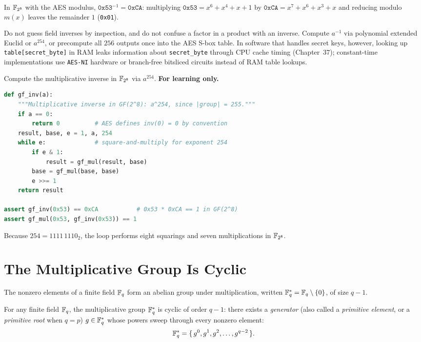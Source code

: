 \begin{example}[An inverse]
\label{ch06:ex-inverse}
In $\mathbb{F}_{2^8}$ with the AES modulus, $\texttt{0x53}^{-1} = \texttt{0xCA}$:
multiplying $\texttt{0x53} = x^6 + x^4 + x + 1$ by $\texttt{0xCA} = x^7 + x^6 +
x^3 + x$ and reducing modulo $m(x)$ leaves the remainder $1$ (\texttt{0x01}).
\end{example}

\begin{trapbox}
Do not guess field inverses by inspection, and do not confuse a factor in a
product with an inverse. Compute $a^{-1}$ via polynomial extended Euclid or
$a^{254}$, or precompute all $256$ outputs once into the AES S-box table. In
software that handles secret keys, however, looking up
\texttt{table[secret\_byte]} in RAM leaks information about
\texttt{secret\_byte} through CPU cache timing
(Chapter~37); constant-time implementations use \texttt{AES-NI} hardware or
branch-free bitsliced circuits instead of RAM table lookups.
\end{trapbox}

\begin{implementbox}
Compute the multiplicative inverse in $\mathbb{F}_{2^8}$ via $a^{254}$. \textbf{For
learning only.}
\begin{lstlisting}[language=Python]
def gf_inv(a):
    """Multiplicative inverse in GF(2^8): a^254, since |group| = 255."""
    if a == 0:
        return 0          # AES defines inv(0) = 0 by convention
    result, base, e = 1, a, 254
    while e:              # square-and-multiply for exponent 254
        if e & 1:
            result = gf_mul(result, base)
        base = gf_mul(base, base)
        e >>= 1
    return result

assert gf_inv(0x53) == 0xCA           # 0x53 * 0xCA == 1 in GF(2^8)
assert gf_mul(0x53, gf_inv(0x53)) == 1
\end{lstlisting}
Because $254 = 1111\,1110_2$, the loop performs eight squarings and seven
multiplications in $\mathbb{F}_{2^8}$.
\end{implementbox}

\section{The Multiplicative Group Is Cyclic}
\label{ch06:cyclic}

The nonzero elements of a finite field $\mathbb{F}_q$ form an abelian group under
multiplication, written $\mathbb{F}_q^{*} = \mathbb{F}_q \setminus \{0\}$, of size $q-1$.

\begin{theorem}
\label{ch06:thm-cyclic}
For any finite field $\mathbb{F}_q$, the multiplicative group $\mathbb{F}_q^{*}$ is cyclic of
order $q-1$: there exists a \emph{generator} (also called a \emph{primitive
element}, or a \emph{primitive root} when $q = p$) $g \in \mathbb{F}_q^{*}$ whose
powers sweep through every nonzero element:
\[
\mathbb{F}_q^{*} = \{\, g^0, g^1, g^2, \dots, g^{q-2} \,\}.
\]
\end{theorem}

